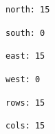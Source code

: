 	\begin{figure}
		\centering
			\begin{minipage}[c][1\totalheight][t]{0.5\columnwidth}

				\begin{center} \texttt{north: 15} \end{center}
				\begin{center} \texttt{south: 0} \end{center}
				\begin{center} \texttt{east: 15} \end{center}
				\begin{center} \texttt{west: 0} \end{center}
				\begin{center} \texttt{rows: 15} \end{center}
				\begin{center} \texttt{cols: 15} \end{center}


\end{minipage}
\end{figure}
